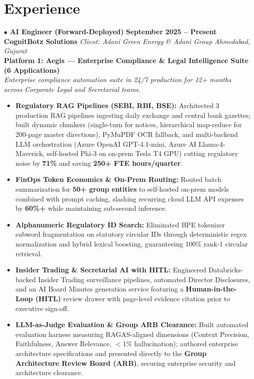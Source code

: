 \documentclass[a4paper,10pt]{article}
\begin{document}
\section{Experience}

\noindent
\textbf{\normalsize $\bullet$ AI Engineer (Forward-Deployed)} \hfill \textbf{September 2025 -- Present} \\
\textbf{CognitBotz Solutions} \textbar{} \textit{Client: Adani Green Energy \& Adani Group} \hfill \textit{Ahmedabad, Gujarat} \\[2pt]
\noindent
\textbf{\color{projecttitle}Platform 1: Aegis — Enterprise Compliance \& Legal Intelligence Suite (6 Applications)} \\
\textit{\small Enterprise compliance automation suite in 24/7 production for 12+ months across Corporate Legal and Secretarial teams.}
\begin{itemize}
    \item \textbf{Regulatory RAG Pipelines (SEBI, RBI, BSE):} Architected 3 production RAG pipelines ingesting daily exchange and central bank gazettes; built dynamic chunkers (single-turn for notices, hierarchical map-reduce for 200-page master directions), PyMuPDF OCR fallback, and multi-backend LLM orchestration (Azure OpenAI GPT-4.1-mini, Azure AI Llama-4-Maverick, self-hosted Phi-3 on on-prem Tesla T4 GPU) cutting regulatory noise by \textbf{71\%} and saving \textbf{250+ FTE hours/quarter}.
    \item \textbf{FinOps Token Economics \& On-Prem Routing:} Routed batch summarization for \textbf{50+ group entities} to self-hosted on-prem models combined with prompt caching, slashing recurring cloud LLM API expenses by \textbf{60\%+} while maintaining sub-second inference.
    \item \textbf{Alphanumeric Regulatory ID Search:} Eliminated BPE tokenizer subword fragmentation on statutory circular IDs through deterministic regex normalization and hybrid lexical boosting, guaranteeing 100\% rank-1 circular retrieval.
    \item \textbf{Insider Trading \& Secretarial AI with HITL:} Engineered Databricks-backed Insider Trading surveillance pipelines, automated Director Disclosures, and an AI Board Minutes generation service featuring a \textbf{Human-in-the-Loop (HITL)} review drawer with page-level evidence citation prior to executive sign-off.
    \item \textbf{LLM-as-Judge Evaluation \& Group ARB Clearance:} Built automated evaluation harness measuring RAGAS-aligned dimensions (Context Precision, Faithfulness, Answer Relevance, $<$1\% hallucination); authored enterprise architecture specifications and presented directly to the \textbf{Group Architecture Review Board (ARB)}, securing enterprise security and architecture clearance.
\end{itemize}
\end{document}
